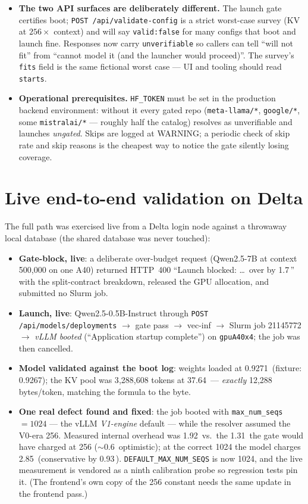 \documentclass[11pt]{article}
\newcommand{\code}[1]{\texttt{#1}}
\newcommand{\gib}{\,\text{GiB}}
\begin{document}
\begin{itemize}[leftmargin=1.4em]
  value follow-up.
\item \textbf{The two API surfaces are deliberately different.} The launch
  gate certifies boot; \code{POST /api/validate-config} is a strict
  worst-case survey (KV at $256\times$ context) and will say
  \code{valid:false} for many configs that boot and launch fine. Responses
  now carry \code{unverifiable} so callers can tell ``will not fit'' from
  ``cannot model it (and the launcher would proceed)''. The survey's
  \code{fits} field is the same fictional worst case --- UI and tooling should
  read \code{starts}.
\item \textbf{Operational prerequisites.} \code{HF\_TOKEN} must be set in the
  production backend environment: without it every gated repo
  (\code{meta-llama/*}, \code{google/*}, some \code{mistralai/*} ---
  roughly half the catalog) resolves as unverifiable and launches
  \emph{ungated}. Skips are logged at WARNING; a periodic check of skip rate
  and skip reasons is the cheapest way to notice the gate silently losing
  coverage.
\end{itemize}

\section{Live end-to-end validation on Delta}
\label{sec:live}

The full path was exercised live from a Delta login node against a throwaway
local database (the shared database was never touched):

\begin{itemize}[leftmargin=1.4em]
\item \textbf{Gate-block, live}: a deliberate over-budget request
  (Qwen2.5-7B at context 500{,}000 on one A40) returned HTTP~400
  ``Launch blocked: \dots\ over by 1.7\gib'' with the split-contract
  breakdown, released the GPU allocation, and submitted no Slurm job.
\item \textbf{Launch, live}: Qwen2.5-0.5B-Instruct through
  \code{POST /api/models/deployments} $\to$ gate pass $\to$ vec-inf $\to$
  Slurm job 21145772 $\to$ \emph{vLLM booted} (``Application startup
  complete'') on \code{gpuA40x4}; the job was then cancelled.
\item \textbf{Model validated against the boot log}: weights loaded at
  0.9271\gib{} (fixture: 0.9267); the KV pool was 3{,}288{,}608 tokens at
  37.64\gib{} --- \emph{exactly} 12{,}288 bytes/token, matching the formula
  to the byte.
\item \textbf{One real defect found and fixed}: the job booted with
  \code{max\_num\_seqs}${}=1024$ --- the vLLM \emph{V1-engine} default ---
  while the resolver assumed the V0-era 256. Measured internal overhead was
  1.92\gib{} vs.\ the 1.31\gib{} the gate would have charged at 256
  ($\sim$0.6\gib{} optimistic); at the correct 1024 the model charges
  2.85\gib{} (conservative by 0.93\gib). \code{DEFAULT\_MAX\_NUM\_SEQS}
  is now 1024, and the live measurement is vendored as a ninth calibration
  probe so regression tests pin it. (The frontend's own copy of the 256
  constant needs the same update in the frontend pass.)
\end{itemize}
\end{document}
